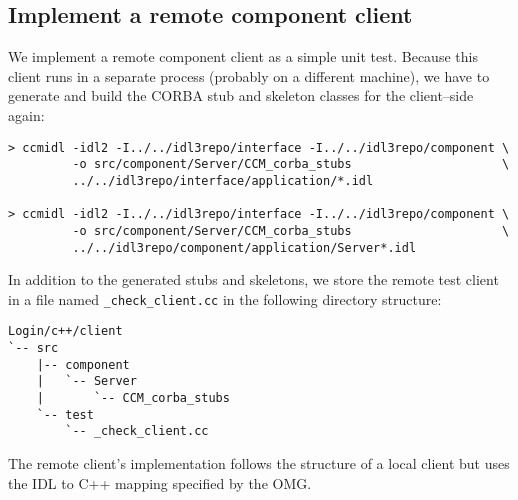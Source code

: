 \subsection{Implement a remote component client}
\label{subsection:ImplementRemoteComponentClient}
We implement a remote component client as a simple unit test.
Because this client runs in a separate process (probably on a different machine), we
have to generate and build the CORBA stub and skeleton classes for the client--side 
again:
\begin{footnotesize}
\begin{verbatim}
> ccmidl -idl2 -I../../idl3repo/interface -I../../idl3repo/component \
         -o src/component/Server/CCM_corba_stubs                     \  
         ../../idl3repo/interface/application/*.idl

> ccmidl -idl2 -I../../idl3repo/interface -I../../idl3repo/component \
         -o src/component/Server/CCM_corba_stubs                     \
         ../../idl3repo/component/application/Server*.idl
\end{verbatim}
\end{footnotesize}

In addition to the generated stubs and skeletons, we store the remote test
client in a file named {\tt \_check\_client.cc} in the following directory structure:
\begin{footnotesize}
\begin{verbatim}
Login/c++/client
`-- src
    |-- component
    |   `-- Server
    |       `-- CCM_corba_stubs
    `-- test
        `-- _check_client.cc
\end{verbatim}
\end{footnotesize}

The remote client's implementation follows the structure of a local client but
uses the IDL to C++ mapping specified by the OMG.

